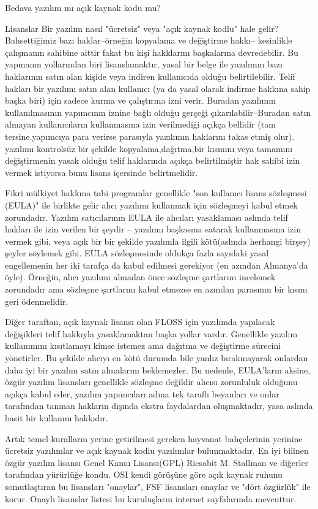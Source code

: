 \begin{section}{Bedava yazılım mı açık kaynak kodu mu?}
\begin{subsection}{Lisanslar}
Bir yazılım nasıl  "ücretsiz" veya "açık kaynak kodlu" hale gelir?  Bahsettiğimiz bazı haklar--örneğin kopyalama ve değiştirme hakkı-- kesinlikle çalışmanın sahibine aittir fakat bu kişi hakklarını başkalarına devredebilir. Bu yapmanın  yollarından biri lisanslamaktır, yasal bir belge ile yazılımın bazı haklarının satın alan kişide veya indiren kullanıcıda olduğu belirtilebilir. Telif hakları bir yazılımı satın alan kullanıcı (ya da yasal olarak indirme hakkına sahip başka biri) için sadece kurma ve çalıştırma izni verir. Buradan yazılımın kullanılmasının yapımcının iznine bağlı olduğu gerçeği çıkarılabilir--Buradan satın almayan kullanıcıların kullanmasına izin verilmediği açıkça bellidir (tam tersine.yapımcıya para verirse parasıyla yazılımın haklarını takas etmiş olur). yazılımı kontrolsüz bir şekilde  kopyalama,dağıtma,bir kısmını veya tamamını değiştirmenin yasak olduğu telif haklarında açıkça belirtilmiştir hak sahibi izin vermek istiyorsa bunu lisans içersinde belirtmelidir.

Fikri mülkiyet hakkına tabi programlar genellikle "son kullanıcı lisans sözleşmesi (EULA)" ile birlikte gelir alıcı yazılımı kullanmak için  sözleşmeyi kabul etmek zorundadır. Yazılım satıcılarının EULA ile  alıcıları yasaklaması aslında telif hakları ile izin verilen bir şeydir -- yazılımı başkasına  satarak kullanmasına izin vermek gibi, veya açık bir bir şekilde yazılımla ilgili kötü(aslında herhangi birşey) şeyler söylemek gibi. EULA  sözleşmesinde oldukça fazla sayıdaki yasal engellemenin her iki tarafça da kabul edilmesi gerekiyor (en azından Almanya'da öyle). Örneğin, alıcı yazılımı almadan önce sözleşme şartlarını incelemek zorundadır ama sözleşme şartlarını kabul etmezse en azından parasının bir kısmı geri ödenmelidir.

Diğer taraftan, açık kaynak lisansı olan FLOSS için yazılımda yapılacak değişikleri telif hakkıyla yasaklamaktan başka yollar vardır. Genellikle yazılım kullanımını kısıtlamayı kimse istemez ama dağıtma ve değiştirme sürecini yönetirler. Bu şekilde alıcıyı en kötü durumda bile yanlız bırakmayarak onlardan daha iyi bir yazılım satın almalarını beklemezler. Bu nedenle, EULA'ların aksine, özgür yazılım lisansları genellikle sözleşme değildir alıcısı zorunluluk olduğunu açıkça kabul eder, yazılım yapımcıları adına tek taraflı beyanları ve onlar tarafından tanınan hakların dışında ekstra faydalardan oluşmaktadır, yasa aslında basit bir kullanım hakkıdır.

Artık temel kuralların yerine getirilmesi gereken hayvanat bahçelerinin yerinine ücretsiz yazılımlar ve  açık kaynak kodlu yazılımlar bulunmaktadır. En iyi bilinen özgür yazılım lisansı Genel Kamu Lisansı(GPL)  Ricsabit M. Stallman ve diğerler tarafından yürürlüğe kondu. OSI kendi görüşüne göre açık kaynak ruhunu somutlaştıran bu lisansları "onaylar", FSF  lisansları onaylar ve "dört özgürlük" ile korur. Onaylı lisanslar listesi bu kuruluşların internet sayfalarında mevcuttur.


\end{subsection}
\end{section}
